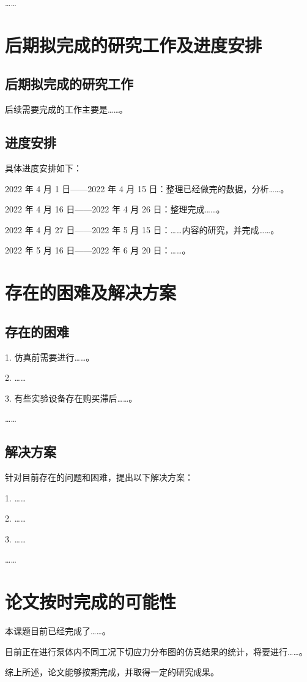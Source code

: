 ……

\section{后期拟完成的研究工作及进度安排}
\subsection{后期拟完成的研究工作}
后续需要完成的工作主要是……。

\subsection{进度安排}
具体进度安排如下：

2022 年 4 月 1 日——2022 年 4 月 15 日：整理已经做完的数据，分析……。

2022 年 4 月 16 日——2022 年 4 月 26 日：整理完成……。

2022 年 4 月 27 日——2022 年 5 月 15 日：……内容的研究，并完成……。

2022 年 5 月 16 日——2022 年 6 月 20 日：……。

\section{存在的困难及解决方案}
\subsection{存在的困难}
1. 仿真前需要进行……。

2. ……

3. 有些实验设备存在购买滞后……。

……

\subsection{解决方案}
针对目前存在的问题和困难，提出以下解决方案：

1. ……

2. ……

3. ……

……

\section{论文按时完成的可能性}
本课题目前已经完成了……。

目前正在进行泵体内不同工况下切应力分布图的仿真结果的统计，将要进行……。

综上所述，论文能够按期完成，并取得一定的研究成果。

